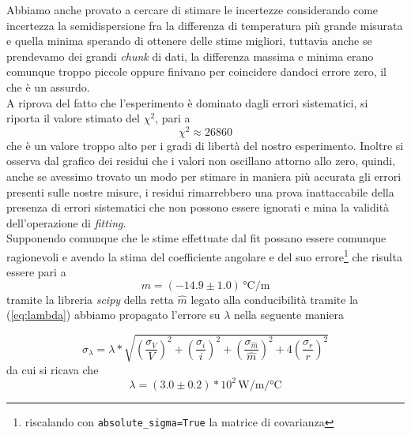 \documentclass{article}
\begin{document}
\noindent Abbiamo anche provato a cercare di stimare le incertezze considerando come incertezza la semidispersione fra la differenza di temperatura più grande misurata e quella minima sperando di ottenere delle stime migliori, tuttavia anche se prendevamo dei grandi \emph{chunk} di dati, la differenza massima e minima erano comunque troppo piccole oppure finivano per coincidere dandoci errore zero, il che è un assurdo. \\
\noindent A riprova del fatto che l'esperimento è dominato dagli errori sistematici, si riporta il valore stimato del $\chi^2$, pari a
\begin{equation*}
	\chi^2 \approx 26860
\end{equation*}
che è un valore troppo alto per i gradi di libertà del nostro esperimento. Inoltre si osserva dal grafico dei residui che i valori non oscillano attorno allo zero, quindi, anche se avessimo trovato un modo per stimare in maniera più accurata gli errori presenti sulle nostre misure, i residui rimarrebbero una prova inattaccabile della presenza di errori sistematici che non possono essere ignorati e mina la validità dell'operazione di \emph{fitting}. \\
Supponendo comunque che le stime effettuate dal fit possano essere comunque ragionevoli e avendo la stima del coefficiente angolare e del suo errore\footnote{riscalando con \texttt{absolute\_sigma=True} la matrice di covarianza} che risulta essere pari a 
\begin{equation}
	m = (-14.9 \pm 1.0) \, \unit{\celsius\per\meter}
\end{equation}
tramite la libreria \emph{scipy} della retta $\hat{m}$ legato alla conducibilità tramite la (\ref{eq:lambda}) abbiamo propagato l'errore su $\lambda$ nella seguente maniera

\begin{equation*}
	\sigma_\lambda = \lambda * \sqrt{ \left( \frac{\sigma_V}{V} \right)^2 + \left( \frac{\sigma_i}{i} \right)^2 + \left( \frac{\sigma_{\hat{m}}}{\hat{m}} \right)^2 + 4 \left(\frac{\sigma_r}{r} \right)^2} 
\end{equation*}
da cui si ricava che
\begin{equation*}
	\lambda = (3.0 \pm 0.2) * 10^2 \, \unit{\watt\per\meter\per\celsius}
\end{equation*}
\end{document}
